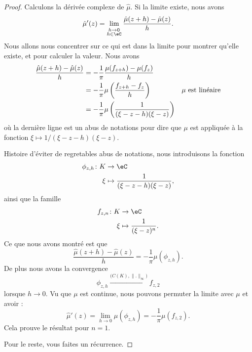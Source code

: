 \begin{proof}
	Calculons la dérivée complexe de \( \hat \mu\). Si la limite existe, nous avons
	\begin{equation}
		\hat \mu'(z)=\lim_{_{\substack{h\to 0\\h\in \eC}}}\frac{ \hat \mu(z+h)-\hat\mu(z) }{ h }.
	\end{equation}
	Nous allons nous concentrer sur ce qui est dans la limite pour montrer qu'elle existe, et pour calculer la valeur. Nous avons
	\begin{subequations}
		\begin{align}
			\frac{ \hat\mu(z+h)-\hat\mu(z) }{ h } & =-\frac{1}{ \pi }\frac{ \mu(f_{z+h})-\mu(f_z) }{ h }                                             \\
			                                      & =-\frac{1}{ \pi }\mu\left( \frac{ f_{z+h}-f_z }{ h } \right)      & \text{\( \mu\) est linéaire} \\
			                                      & =-\frac{1}{ \pi }\mu\left( \frac{ 1 }{ (\xi-z-h)(\xi-z) } \right)
		\end{align}
	\end{subequations}
	où la dernière ligne est un abus de notations pour dire que \( \mu\) est appliquée à la fonction \( \xi\mapsto 1/(\xi-z-h)(\xi-z)\).

	Histoire d'éviter de regretables abus de notations, nous introduisons la fonction
	\begin{equation}
		\begin{aligned}
			\phi_{z,h}\colon K & \to \eC                               \\
			\xi                & \mapsto \frac{1}{ (\xi-z-h)(\xi-z) },
		\end{aligned}
	\end{equation}
	ainsi que la famille
	\begin{equation}
		\begin{aligned}
			f_{z,n}\colon K & \to \eC                        \\
			\xi             & \mapsto \frac{1}{ (\xi-z)^n }.
		\end{aligned}
	\end{equation}
	Ce que nous avons montré est que
	\begin{equation}
		\frac{ \hat \mu(z+h)-\hat \mu(z) }{ h }=-\frac{1}{ \pi }\mu(\phi_{z,h}).
	\end{equation}
	De plus nous avons la convergence
	\begin{equation}
		\phi_{z,h}\stackrel{\big( C(K),\| . \|_{\infty} \big)}{\longrightarrow}f_{z,2}
	\end{equation}
	lorsque \( h\to 0\). Vu que \( \mu\) est continue, nous pouvons permuter la limite avec \( \mu\) et avoir :
	\begin{equation}
		\hat\mu'(z)=\lim_{h\to 0} \mu(\phi_{z,h})=-\frac{1}{ \pi }\mu(f_{z,2}).
	\end{equation}
	Cela prouve le résultat pour \( n=1\).

	Pour le reste, vous faites un récurrence.
\end{proof}

